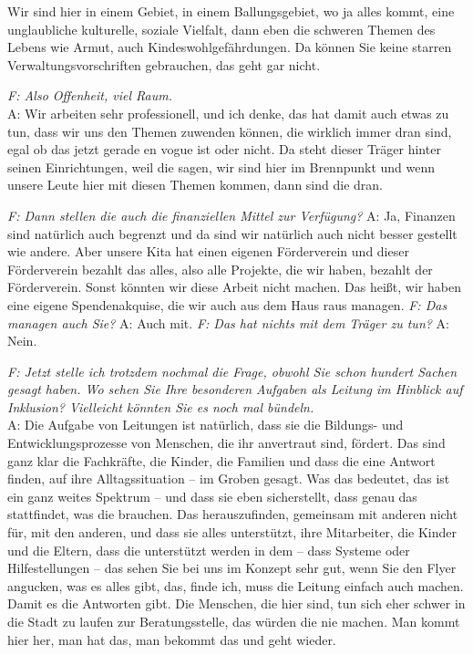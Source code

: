 \begin{linenumbers*}
Wir sind hier in einem Gebiet, in einem Ballungsgebiet, wo ja alles kommt, eine unglaubliche kulturelle, soziale Vielfalt, dann eben die schweren Themen des Lebens wie Armut, auch Kindeswohlgefährdungen.
Da können Sie keine starren Verwaltungsvorschriften gebrauchen, das geht gar nicht. 

\emph{F: Also Offenheit, viel Raum.}\\
A: Wir arbeiten sehr professionell, und ich denke, das hat damit auch etwas zu tun, dass wir uns den Themen zuwenden können, die wirklich immer dran sind, egal ob das jetzt gerade en vogue ist oder nicht. Da steht dieser Träger hinter seinen Einrichtungen, weil die sagen, wir sind hier im Brennpunkt und wenn unsere Leute hier mit diesen Themen kommen, dann sind die dran. 

\emph{F: Dann stellen die auch die finanziellen Mittel zur Verfügung?}
A: Ja, Finanzen sind natürlich auch begrenzt und da sind wir natürlich auch nicht besser gestellt wie andere. 
Aber unsere Kita hat einen eigenen Förderverein und dieser Förderverein bezahlt das alles, also alle Projekte, die wir haben, bezahlt der Förderverein. Sonst könnten wir diese Arbeit nicht machen. Das heißt, wir haben eine eigene Spendenakquise, die wir auch aus dem Haus raus managen. 
\emph{F: Das managen auch Sie?}
A: Auch mit. 
\emph{F: Das hat nichts mit dem Träger zu tun?}
A: Nein.

\emph{F: Jetzt stelle ich trotzdem nochmal die Frage, obwohl Sie schon hundert Sachen gesagt haben. Wo sehen Sie Ihre besonderen Aufgaben als Leitung im Hinblick auf Inklusion? Vielleicht könnten Sie es noch mal bündeln.}\\ 
A: Die Aufgabe von Leitungen ist natürlich, dass sie die Bildungs- und Entwicklungsprozesse von Menschen, die ihr anvertraut sind, fördert. Das sind ganz klar die Fachkräfte, die Kinder, die Familien und dass die eine Antwort finden, auf ihre Alltagssituation -- im Groben gesagt. Was das bedeutet, das ist ein ganz weites Spektrum -- und dass sie eben sicherstellt, dass genau das stattfindet, was die brauchen. Das herauszufinden, gemeinsam mit anderen nicht für, mit den anderen, und dass sie alles unterstützt, ihre Mitarbeiter, die Kinder und die Eltern, dass die unterstützt werden in dem -- dass Systeme oder Hilfestellungen -- das sehen Sie bei uns im Konzept sehr gut, wenn Sie den Flyer angucken, was es alles gibt, das, finde ich, muss die Leitung einfach auch machen. Damit es die Antworten gibt. Die Menschen, die hier sind, tun sich eher schwer in die Stadt zu laufen zur Beratungsstelle, das würden die nie machen. Man kommt hier her, man hat das, man bekommt das und geht wieder.


\end{linenumbers*}
